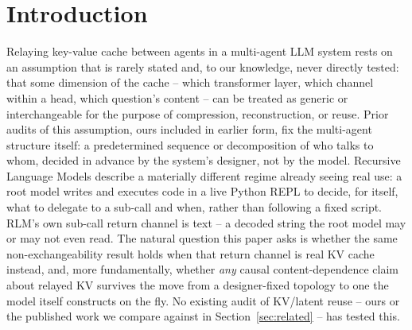 \documentclass[11pt]{article}
\begin{document}
\section{Introduction}

Relaying key-value cache between agents in a multi-agent LLM system rests
on an assumption that is rarely stated and, to our knowledge, never
directly tested: that some dimension of the cache -- which transformer
layer, which channel within a head, which question's content -- can be
treated as generic or interchangeable for the purpose of compression,
reconstruction, or reuse. Prior audits of this assumption, ours included
in earlier form, fix the multi-agent structure itself: a predetermined
sequence or decomposition of who talks to whom, decided in advance by the
system's designer, not by the model. Recursive Language Models
\citep{rlm2026} describe a materially different regime already seeing
real use: a root model writes and executes code in a live Python REPL to
decide, for itself, what to delegate to a sub-call and when, rather than
following a fixed script. RLM's own sub-call return channel is
text -- a decoded string the root model may or may not even read. The
natural question this paper asks is whether the same non-exchangeability
result holds when that return channel is real KV cache instead, and,
more fundamentally, whether \emph{any} causal content-dependence claim
about relayed KV survives the move from a designer-fixed topology to one
the model itself constructs on the fly. No existing audit of KV/latent
reuse -- ours or the published work we compare against in
Section~\ref{sec:related} -- has tested this.
\end{document}
